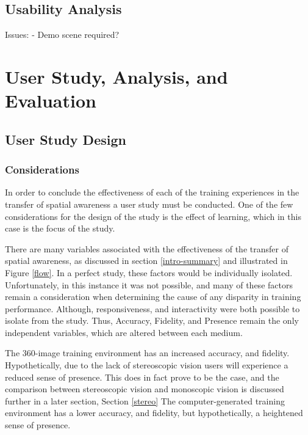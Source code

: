 \documentclass[a4paper, openright, twoside]{report}
\begin{document}
\section{Usability Analysis}
Issues:
- Demo scene required?























\chapter{User Study, Analysis, and Evaluation}

\section{User Study Design}

\subsection{Considerations}
In order to conclude the effectiveness of each of the training experiences in the transfer of spatial awareness a user study must be conducted. One of the few considerations for the design of the study is the effect of learning, which in this case is the focus of the study.

There are many variables associated with the effectiveness of the transfer of spatial awareness, as discussed in section \ref{intro-summary} and illustrated in Figure \ref{flow}. In a perfect study, these factors would be individually isolated. Unfortunately, in this instance it was not possible, and many of these factors remain a consideration when determining the cause of any disparity in training performance. Although, responsiveness, and interactivity were both possible to isolate from the study. Thus, Accuracy, Fidelity, and Presence remain the only independent variables, which are altered between each medium. 

The 360-image training environment has an increased accuracy, and fidelity. Hypothetically, due to the lack of stereoscopic vision users will experience a reduced sense of presence. This does in fact prove to be the case, and the comparison between stereoscopic vision and monoscopic vision is discussed further in a later section, Section \ref{stereo}
The computer-generated training environment has a lower accuracy, and fidelity, but hypothetically, a heightened sense of presence. 
\end{document}
